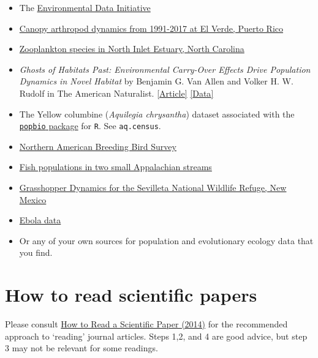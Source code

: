 \documentclass[]{book}
\begin{document}
\begin{itemize}
\item
  The \href{https://portal.edirepository.org/nis/home.jsp}{Environmental
  Data Initiative}
\item
  \href{https://portal.edirepository.org/nis/metadataviewer?packageid=knb-lter-luq.96.2410865}{Canopy
  arthropod dynamics from 1991-2017 at El Verde, Puerto Rico}
\item
  \href{https://portal.edirepository.org/nis/mapbrowse?packageid=knb-lter-nin.2.1}{Zooplankton
  species in North Inlet Estuary, North Carolina}
\item
  \emph{Ghosts of Habitats Past: Environmental Carry-Over Effects Drive
  Population Dynamics in Novel Habitat} by Benjamin G. Van Allen and
  Volker H. W. Rudolf in The American Naturalist.
  \href{https://www.journals.uchicago.edu/doi/10.1086/670127?mobileUi=0}{{[}Article{]}}
  \href{https://datadryad.org/stash/dataset/doi:10.5061/dryad.t4g3r}{{[}Data{]}}
\item
  The Yellow columbine (\emph{Aquilegia chrysantha}) dataset associated
  with the
  \href{https://cran.r-project.org/web/packages/popbio/index.html}{\texttt{popbio}
  package} for \texttt{R}. See \texttt{aq.census}.
\item
  \href{https://www.pwrc.usgs.gov/BBS/RawData/}{Northern American
  Breeding Bird Survey}
\item
  \href{https://portal.edirepository.org/nis/mapbrowse?packageid=knb-lter-cwt.3026.13}{Fish
  populations in two small Appalachian streams}
\item
  \href{https://portal.edirepository.org/nis/mapbrowse?packageid=knb-lter-sev.106.214968}{Grasshopper
  Dynamics for the Sevilleta National Wildlife Refuge, New Mexico}
\item
  \href{https://apps.who.int/gho/data/node.ebola-sitrep.quick-downloads?lang=en}{Ebola
  data}
\item
  Or any of your own sources for population and evolutionary ecology
  data that you find.
\end{itemize}

\section{How to read scientific
papers}\label{how-to-read-scientific-papers}

Please consult
\href{https://www.research4life.org/blog/how-to-read-a-scientific-paper/}{How
to Read a Scientific Paper (2014)} for the recommended approach to
`reading' journal articles. Steps 1,2, and 4 are good advice, but step 3
may not be relevant for some readings.
\end{document}
